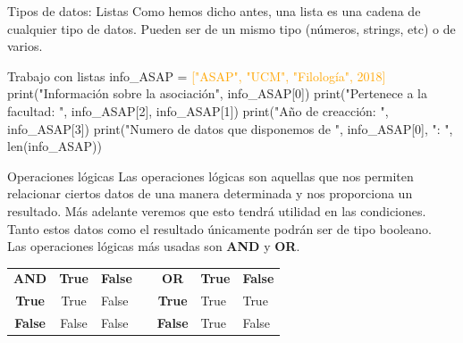 \documentclass{beamer}
\begin{document}
    \begin{frame}{Tipos de datos: Listas}
        \label{datos:listas}
        Como hemos dicho antes, una lista es una cadena de cualquier tipo de datos. Pueden ser de un mismo tipo (números, strings, etc) o de varios.
        \begin{Programexample}{Trabajo con listas}
        	info\_ASAP = \textcolor{orange}{["ASAP", "UCM", "Filología", 2018]}
        	\newline\newline
        	print("Información sobre la asociación",  info\_ASAP[0])\newline
        	print("Pertenece a la facultad: ", info\_ASAP[2], info\_ASAP[1]) \newline
        	print("Año de creacción: ", info\_ASAP[3])\newline
        	print("Numero de datos que disponemos de ", info\_ASAP[0], ": ", len(info\_ASAP))
        \end{Programexample}
    \end{frame}
    
    \begin{frame}{Operaciones lógicas}
        Las operaciones lógicas son aquellas que nos permiten relacionar ciertos datos de una manera determinada y nos proporciona un resultado. Más adelante veremos que esto tendrá utilidad en las condiciones.\\
        Tanto estos datos como el resultado únicamente podrán ser de tipo booleano.\\
        Las operaciones lógicas más usadas son \textbf{AND} y \textbf{OR}.
        \begin{table}[]
            \begin{tabular}{|c|c|l|l|c|l|l|}
            \cline{1-3} \cline{5-7}
            \textbf{AND}   & \textbf{True}  & \textbf{False} &  & \textbf{OR}    & \textbf{True} & \textbf{False} \\ \cline{1-3} \cline{5-7} 
            \textbf{True}  & True  & False &  & \textbf{True}  & True & True  \\ \cline{1-3} \cline{5-7} 
            \textbf{False} & False & False &  & \textbf{False} & True & False \\ \cline{1-3} \cline{5-7} 
            \end{tabular}
        \end{table}
    \end{frame}
    
\end{document}
